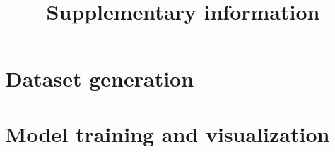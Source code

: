 \documentclass{article}
\title{Supplementary information}
\date{\vspace{-5ex}}
\begin{document}
\maketitle

\section{Dataset generation}


\section{Model training and visualization}


{\small
}

\end{document}
